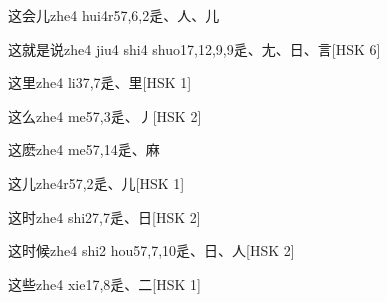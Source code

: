 \begin{EntryWithPhonetic}{这会儿}{zhe4 hui4r5}{7,6,2}{⾡、⼈、⼉}
\end{EntryWithPhonetic}

\begin{EntryWithPhonetic}{这就是说}{zhe4 jiu4 shi4 shuo1}{7,12,9,9}{⾡、⼪、⽇、⾔}[HSK 6]
\end{EntryWithPhonetic}

\begin{EntryWithPhonetic}{这里}{zhe4 li3}{7,7}{⾡、⾥}[HSK 1]
\end{EntryWithPhonetic}

\begin{EntryWithPhonetic}{这么}{zhe4 me5}{7,3}{⾡、⼃}[HSK 2]
\end{EntryWithPhonetic}

\begin{EntryWithPhonetic}{这麽}{zhe4 me5}{7,14}{⾡、⿇}
\end{EntryWithPhonetic}

\begin{EntryWithPhonetic}{这儿}{zhe4r5}{7,2}{⾡、⼉}[HSK 1]
\end{EntryWithPhonetic}

\begin{EntryWithPhonetic}{这时}{zhe4 shi2}{7,7}{⾡、⽇}[HSK 2]
\end{EntryWithPhonetic}

\begin{EntryWithPhonetic}{这时候}{zhe4 shi2 hou5}{7,7,10}{⾡、⽇、⼈}[HSK 2]
\end{EntryWithPhonetic}

\begin{EntryWithPhonetic}{这些}{zhe4 xie1}{7,8}{⾡、⼆}[HSK 1]
\end{EntryWithPhonetic}

